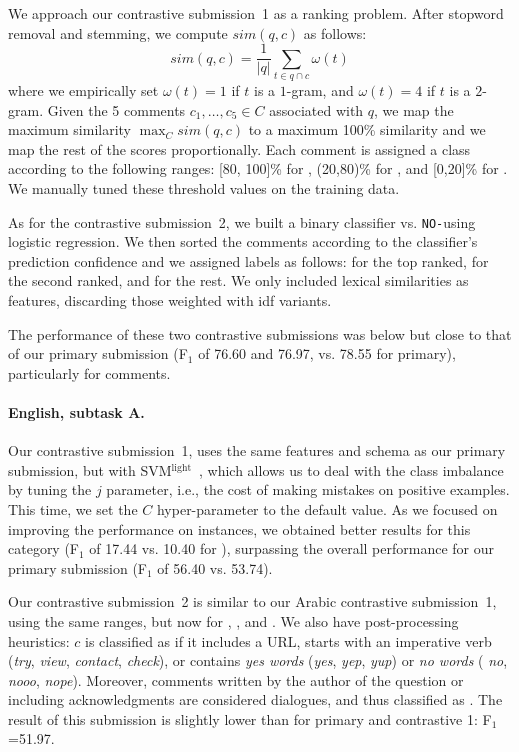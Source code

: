 We approach our contrastive submission~1 as a ranking problem.
After stopword removal and stemming, we compute $sim(q,c)$ as follows:
\begin{equation}
 sim(q,c) = \frac{1}{|q|} \sum_{t\in q\cap c} \omega(t)
 \label{eq:overlap}
\end{equation}
% 
where we empirically set $\omega(t)=1$ if $t$ is a $1$-gram,
and $\omega(t)=4$ if $t$ is a $2$-gram.
Given the 5 comments $c_1,\ldots,c_5\in C$ associated with $q$,
we map the maximum similarity $\max_C sim(q,c)$
to a maximum 100\% similarity and we map the rest of the scores proportionally. 
Each comment is assigned a class according to the following ranges: [80, 100]\% 
for \dir, (20,80)\% for \rel, and [0,20]\% for \irel.
We manually tuned these threshold values on the training data.

As for the contrastive submission~2, we built a binary classifier \dir vs. 
\texttt{NO-}\dir using logistic regression. We then sorted the comments 
according to the classifier's prediction confidence and we assigned labels as 
follows: \dir for the top ranked, \rel for the second ranked, and \irel for the 
rest. We only included lexical similarities as features, discarding those weighted 
with idf variants.


The performance of these two contrastive submissions was below but close to 
that of our primary submission (F$_1$ of 76.60 and 76.97, vs. 78.55 for 
primary), particularly for \irel comments. 


\paragraph{English, subtask A.}

Our contrastive submission~1, uses the same features and schema as our primary 
submission, but with SVM$^\mathrm{light}$~\cite{Joachims:99}, which allows us 
to deal with the class imbalance by tuning the $j$ parameter, i.e., the cost of 
making mistakes on positive examples. This time, we set the $C$ hyper-parameter 
to the default value. As we focused on improving the performance on \pot instances,
we obtained better results for this category (F$_1$ of 17.44 vs. 10.40 for \pot),
surpassing the overall performance for our primary submission (F$_1$ of 56.40 vs. 53.74).

Our contrastive submission~2 is similar to our Arabic contrastive submission~1,
using the same ranges, but now for \good, \pot, and \bad. We also have post-processing 
heuristics:
$c$ is classified as \good if it includes a URL, starts with an imperative verb (\eg \textit{try}, 
\textit{view}, \textit{contact}, \textit{check}), or contains \textit{yes words} 
(\eg \textit{yes}, \textit{yep}, \textit{yup}) or \textit{no words} (\eg 
\textit{no}, \textit{nooo}, \textit{nope}). Moreover, comments written by the author of 
the question or including acknowledgments are considered dialogues,
and thus classified as \bad. The result of this submission is slightly lower than
for primary and contrastive 1: F$_1$=51.97.


